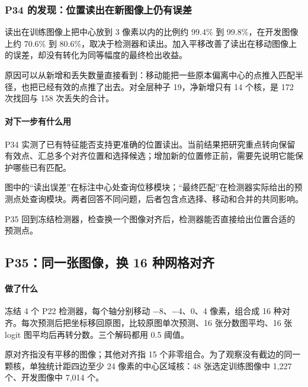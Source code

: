 \documentclass[
  12pt,
  fontset=fandol]{ctexart}
\begin{document}
\subsubsection{P34 的发现：位置读出在新图像上仍有误差}\label{chapter15}
读出在训练图像上把中心放到 3 像素以内的比例约 99.4\% 到 99.8\%，在开发图像上约 70.6\% 到 80.6\%，取决于检测器和读出。加入平移改善了读出在移动图像上的误差，却没有转化为同等幅度的最终检出收益。

原因可以从新增和丢失数量直接看到：移动能把一些原本偏离中心的点推入匹配半径，也把已经有效的点推了出去。对全层种子 19，净新增只有 14 个核，是 172 次找回与 158 次丢失的合计。

\paragraph{对下一步有什么用}
P34 实测了已有特征能否支持更准确的位置读出。当前结果把研究重点转向保留有效点、汇总多个对齐位置和选择候选；增加新的位置修正前，需要先说明它能保护哪些已有匹配。

图中的“读出误差”在标注中心处查询位移模块；“最终匹配”在检测器实际给出的预测点处查询模块。两者回答不同问题，后者包含点选择、移动和合并的共同影响。

P35 回到冻结检测器，检查换一个图像对齐后，检测器能否直接给出位置合适的预测点。

\subsection{P35：同一张图像，换 16 种网格对齐}\label{chapter16}
\paragraph{做了什么}
冻结 4 个 P22 检测器，每个轴分别移动 \ensuremath{-}8、\ensuremath{-}4、0、4 像素，组合成 16 种对齐。每次预测后把坐标移回原图，比较原图单次预测、16 张分数图平均、16 张 logit 图平均后再转分数。三个解码都用 0.5 阈值。

原对齐指没有平移的图像；其他对齐指 15 个非零组合。为了观察没有截边的同一颗核，单独统计距四边至少 24 像素的中心区域核：48 张选定训练图像中 1,227 个、开发图像中 7,014 个。
\end{document}
